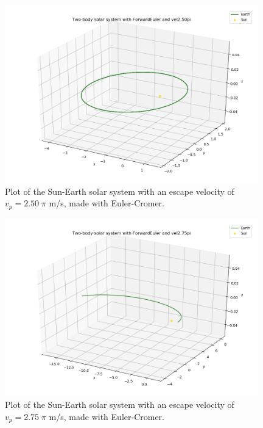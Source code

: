 \documentclass{article}
\begin{document}
    \begin{figure}[H]
        \centering
        \includegraphics[width = 11cm]{img/plot3D_S_E_F_vel250pi.png}
        \caption{Plot of the Sun-Earth solar system with an escape velocity of $v_p = 2.50 \; \pi$ m/s, made with Euler-Cromer. }
        \label{fig:plot3D_S_E_F_vel250pi}
    \end{figure}

    \begin{figure}[H]
        \centering
        \includegraphics[width = 11cm]{img/plot3D_S_E_F_vel275pi.png}
        \caption{Plot of the Sun-Earth solar system with an escape velocity of $v_p = 2.75 \; \pi$ m/s, made with Euler-Cromer. }
        \label{fig:plot3D_S_E_F_vel275pi}
    \end{figure}
\end{document}
